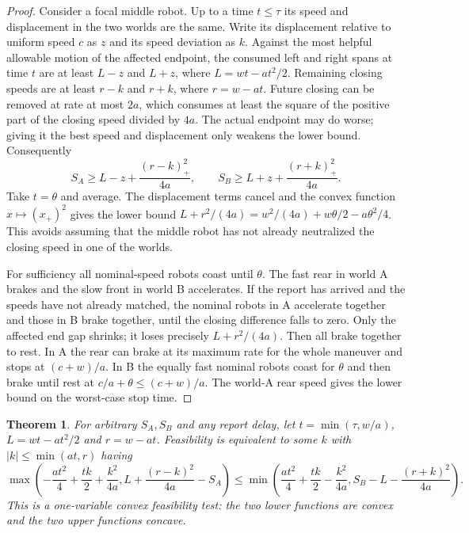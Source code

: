 \documentclass[11pt]{article}
\newtheorem{theorem}{Theorem}
\begin{document}
\begin{proof}
Consider a focal middle robot. Up to a time $t\le\tau$ its speed and displacement in the two worlds are the same. Write its displacement relative to uniform speed $c$ as $z$ and its speed deviation as $k$. Against the most helpful allowable motion of the affected endpoint, the consumed left and right spans at time $t$ are at least $L-z$ and $L+z$, where $L=wt-at^2/2$. Remaining closing speeds are at least $r-k$ and $r+k$, where $r=w-at$. Future closing can be removed at rate at most $2a$, which consumes at least the square of the positive part of the closing speed divided by $4a$. The actual endpoint may do worse; giving it the best speed and displacement only weakens the lower bound. Consequently
\[
 S_A\ge L-z+\frac{(r-k)_+^2}{4a},\qquad
 S_B\ge L+z+\frac{(r+k)_+^2}{4a}.
\]
Take $t=\theta$ and average. The displacement terms cancel and the convex function $x\mapsto(x_+)^2$ gives the lower bound $L+r^2/(4a)=w^2/(4a)+w\theta/2-a\theta^2/4$. This avoids assuming that the middle robot has not already neutralized the closing speed in one of the worlds.

For sufficiency all nominal-speed robots coast until $\theta$. The fast rear in world A brakes and the slow front in world B accelerates. If the report has arrived and the speeds have not already matched, the nominal robots in A accelerate together and those in B brake together, until the closing difference falls to zero. Only the affected end gap shrinks; it loses precisely $L+r^2/(4a)$. Then all brake together to rest. In A the rear can brake at its maximum rate for the whole maneuver and stops at $(c+w)/a$. In B the equally fast nominal robots coast for $\theta$ and then brake until rest at $c/a+\theta\le(c+w)/a$. The world-A rear speed gives the lower bound on the worst-case stop time.
\end{proof}

\begin{theorem}
For arbitrary $S_A,S_B$ and any report delay, let $t=\min(\tau,w/a)$, $L=wt-at^2/2$ and $r=w-at$. Feasibility is equivalent to some $k$ with $|k|\le\min(at,r)$ having
\[
 \max\!\left(-\frac{at^2}{4}+\frac{t k}{2}+\frac{k^2}{4a},
             L+\frac{(r-k)^2}{4a}-S_A\right)
 \le
 \min\!\left(\frac{at^2}{4}+\frac{t k}{2}-\frac{k^2}{4a},
             S_B-L-\frac{(r+k)^2}{4a}\right).
\]
This is a one-variable convex feasibility test: the two lower functions are convex and the two upper functions concave.
\end{theorem}
\end{document}
